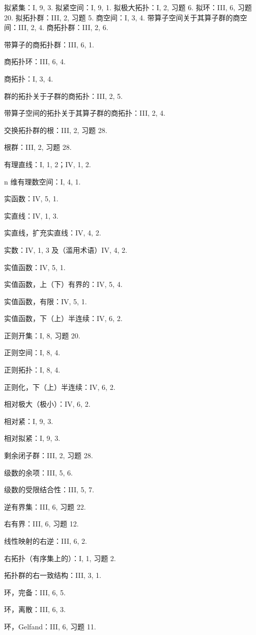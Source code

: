 拟紧集：I, 9, 3. 拟紧空间：I, 9, 1. 拟极大拓扑：I, 2, 习题 6. 拟环：III, 6, 习题 20. 拟拓扑群：III, 2, 习题 5. 商空间：I, 3, 4. 带算子空间关于其算子群的商空间：III, 2, 4. 商拓扑群：III, 2, 6.

带算子的商拓扑群：III, 6, 1.

商拓扑环：III, 6, 4.

商拓扑：I, 3, 4.

群的拓扑关于子群的商拓扑：III, 2, 5.

带算子空间的拓扑关于其算子群的商拓扑：III, 2, 4.

交换拓扑群的根：III, 2, 习题 28.

根群：III, 2, 习题 28.

有理直线：I, 1, 2；IV, 1, 2.

n 维有理数空间：I, 4, 1.

实函数：IV, 5, 1.

实直线：IV, 1, 3.

实直线，扩充实直线：IV, 4, 2.

实数：IV, 1, 3 及（滥用术语）IV, 4, 2.

实值函数：IV, 5, 1.

实值函数，上（下）有界的：IV, 5, 4.

实值函数，有限：IV, 5, 1.

实值函数，下（上）半连续：IV, 6, 2.

正则开集：I, 8, 习题 20.

正则空间：I, 8, 4.

正则拓扑：I, 8, 4.

正则化，下（上）半连续：IV, 6, 2.

相对极大（极小）：IV, 6, 2.

相对紧：I, 9, 3.

相对拟紧：I, 9, 3.

剩余闭子群：III, 2, 习题 28.

级数的余项：III, 5, 6.

级数的受限结合性：III, 5, 7.

逆有界集：III, 6, 习题 22.

右有界：III, 6, 习题 12.

线性映射的右逆：III, 6, 2.

右拓扑（有序集上的）：I, 1, 习题 2.

拓扑群的右一致结构：III, 3, 1.

环，完备：III, 6, 5.

环，离散：III, 6, 3.

环，Gelfand：III, 6, 习题 11.

